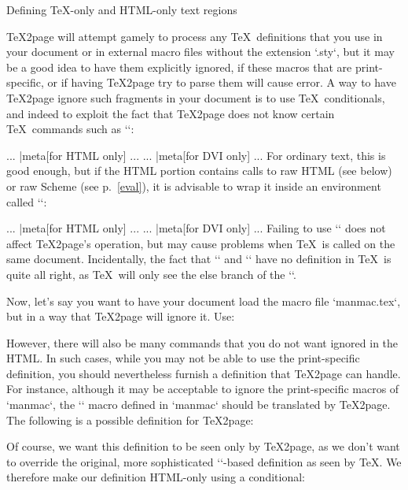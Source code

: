 \beginsection Defining \TeX-only and HTML-only text regions

\TeX2page will attempt gamely to process any \TeX\
definitions that you use in your document or in
external macro files without the extension `.sty`,
but it may be a good idea to have them explicitly
ignored, if these
macros that are print-specific, or if
having \TeX2page try to parse them will cause error.  A way
to have \TeX2page ignore such fragments in your document
is  to use
\TeX\ conditionals, and indeed to exploit the
fact that \TeX2page does not know certain \TeX\ commands
such as `\shipout`:

\begintt
\ifx\shipout\UnDeFiNeD
  ... |meta[for HTML only] ...
\else
  ... |meta[for DVI only] ...
\fi
\endtt
%
For ordinary text, this is good enough, but
if the HTML portion contains calls to raw HTML (see
below) or raw
Scheme (see p.~\ref{eval}), it is advisable to wrap it inside
an environment called
`\htmlonly`:

\begintt
\ifx\shipout\UnDeFiNeD
  \htmlonly
    ... |meta[for HTML only] ...
  \endhtmlonly
\else
  ... |meta[for DVI only] ...
\fi
\endtt
%
Failing to use `\htmlonly` does not affect
\TeX2page’s operation, but may cause problems when \TeX\
is called on the same document.
Incidentally, the fact that `\htmlonly` and `\endhtmlonly`
have no definition in \TeX\ is quite all right, as \TeX\
will only see the else branch of the `\ifx`.

Now, let’s say you want to have  your document load the macro file
`manmac.tex`, but in a way that \TeX2page will ignore
it.  Use:

\index{input@``}
\begintt
\ifx\shipout\UnDeFiNeD
\else
  
\fi
\endtt
%
However, there will also be many  commands that
you do not want ignored in the HTML.  In such
cases, while you may not be able to use the print-specific
definition, you should nevertheless furnish a definition that \TeX2page
can handle.  For instance, although it may be acceptable
to ignore the print-specific macros of `manmac`, the
`\bull` macro defined in `manmac` should be
translated by \TeX2page.  The following is a possible
definition for \TeX2page:

\index{def@`\def`}
\begintt
\def\bull{{\bf *}}
\endtt
%
Of course, we want this definition to be seen only
by \TeX2page, as we don’t want to override the
original, more sophisticated `\vrule`-based definition as seen
by \TeX.
We therefore make our
definition HTML-only
using a conditional:


